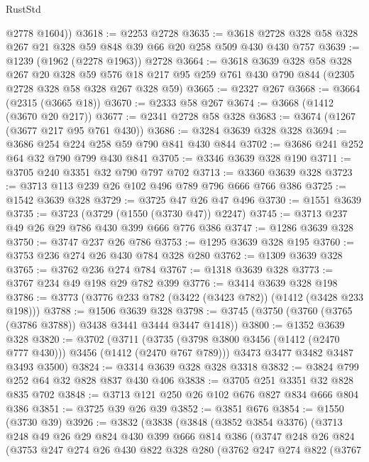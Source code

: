 \begin{lexlean}{RustStd}
\begin{coremodule}
{\begin{coremodule}
{{{{{{{{{{        @2778
        @1604))
@3618 := @2253 @2728
@3635 := @3618 @2728 @328 @58 @328 @267 @21 @328 @59 @848 @39 @66 @20 @258 @509 @430 @430 @757
@3639 := @1239 (@1962 (@2278 @1963)) @2728
@3664 := @3618
    @3639
    @328
    @58
    @328
    @267
    @20
    @328
    @59
    @576
    @18
    @217
    @95
    @259
    @761
    @430
    @790
    @844
    (@2305 @2728 @328 @58 @328 @267 @328 @59)
@3665 := @2327 @267
@3668 := @3664 (@2315 (@3665 @18))
@3670 := @2333 @58 @267
@3674 := @3668 (@1412 (@3670 @20 @217))
@3677 := @2341 @2728 @58 @328
@3683 := @3674 (@1267 (@3677 @217 @95 @761 @430))
@3686 := @3284 @3639 @328 @328
@3694 := @3686 @254 @224 @258 @59 @790 @841 @430 @844
@3702 := @3686 @241 @252 @64 @32 @790 @799 @430 @841
@3705 := @3346 @3639 @328 @190
@3711 := @3705 @240 @3351 @32 @790 @797 @702
@3713 := @3360 @3639 @328
@3723 := @3713 @113 @239 @26 @102 @496 @789 @796 @666 @766 @386
@3725 := @1542 @3639 @328
@3729 := @3725 @47 @26 @47 @496
@3730 := @1551 @3639
@3735 := @3723 (@3729 (@1550 (@3730 @47)) @2247)
@3745 := @3713 @237 @49 @26 @29 @786 @430 @399 @666 @776 @386
@3747 := @1286 @3639 @328
@3750 := @3747 @237 @26 @786
@3753 := @1295 @3639 @328 @195
@3760 := @3753 @236 @274 @26 @430 @784 @328 @280
@3762 := @1309 @3639 @328
@3765 := @3762 @236 @274 @784
@3767 := @1318 @3639 @328
@3773 := @3767 @234 @49 @198 @29 @782 @399
@3776 := @3414 @3639 @328 @198
@3786 := @3773 (@3776 @233 @782 (@3422 (@3423 @782)) (@1412 (@3428 @233 @198)))
@3788 := @1506 @3639 @328
@3798 := @3745 (@3750 (@3760 (@3765 (@3786 @3788)) @3438 @3441 @3444 @3447 @1418))
@3800 := @1352 @3639 @328
@3820 := @3702
    (@3711
      (@3735 (@3798 @3800 @3456 (@1412 (@2470 @777 @430))) @3456 (@1412 (@2470 @767 @789)))
      @3473
      @3477
      @3482
      @3487
      @3493
      @3500)
@3824 := @3314 @3639 @328 @328 @3318
@3832 := @3824 @799 @252 @64 @32 @828 @837 @430 @406
@3838 := @3705 @251 @3351 @32 @828 @835 @702
@3848 := @3713 @121 @250 @26 @102 @676 @827 @834 @666 @804 @386
@3851 := @3725 @39 @26 @39
@3852 := @3851 @676
@3854 := @1550 (@3730 @39)
@3926 := @3832
    (@3838
      (@3848
        (@3852 @3854 @3376)
        (@3713
          @248
          @49
          @26
          @29
          @824
          @430
          @399
          @666
          @814
          @386
          (@3747
            @248
            @26
            @824
            (@3753
              @247
              @274
              @26
              @430
              @822
              @328
              @280
              (@3762
                @247
                @274
                @822
                (@3767
}}}}}}}}}}
\end{coremodule}}
\end{coremodule}
\end{lexlean}
